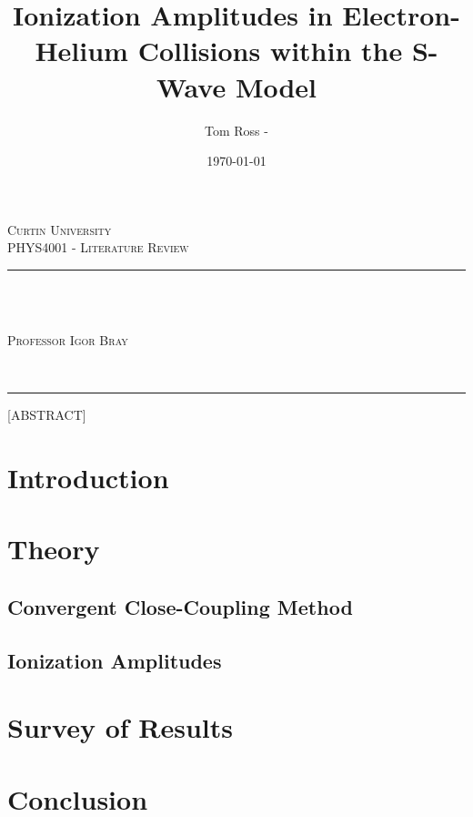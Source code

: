 \documentclass[draft]{article}
\title{Ionization Amplitudes in Electron-Helium Collisions within the S-Wave Model}
\author{Tom Ross - \thestudentid}
\date{\today}
\gdef\theassessment{PHYS4001 - Literature Review}
\gdef\thesupervisor{Professor Igor Bray}
\gdef\theinstitution{Curtin University}
\begin{document}

\begin{titlepage}
  {
    \centering
    {
      \scshape\large\theinstitution
      ~\\
      \scshape\large\theassessment
      \par
    }
    \vspace{1 em}
    \hrule
    ~\\
    {
      \scshape\huge\thetitle
      \par
    }
    \vspace{1 em}
    {
      \scshape\large
      {
        \theauthor
        ~\\
        \thesupervisor
      }
      \par
    }
    ~\\
    \hrule
  }
  \vspace{2 em}
  {
  }
  {
    [ABSTRACT]
  }
\end{titlepage}

\clearpage


\tableofcontents
\listoffigures

\listoftables


\clearpage

\section{Introduction}
\label{sec:introduction}

\section{Theory}
\label{sec:theory}

\subsection{Convergent Close-Coupling Method}
\label{sec:ccc-method}

\subsection{Ionization Amplitudes}
\label{sec:ionization-amplitudes}

\section{Survey of Results}
\label{sec:survey-results}



\section{Conclusion}
\label{sec:conclusion}

\clearpage



\end{document}
